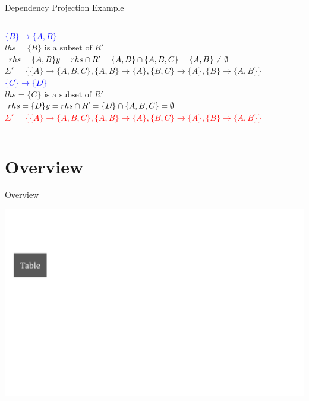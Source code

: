 \documentclass[UTF8]{beamer}
\begin{document}
\begin{frame}[fragile]{Dependency Projection Example}
\begin{columns}
\begin{column}{0.7\textwidth}
    \vspace{0.1cm}
    \pause
    \textcolor{blue}{$\{B\} \to \{A,B\}$}\\
    $lhs = \{B\} \text{ is a subset of } R'$\\
    $rhs = \{A,B\}\\
    y = rhs \cap R' = \{A,B\}\cap\{A,B,C\} = \{A,B\} \neq \emptyset$\\
    $\Sigma' = \{\{A\}\to \{A,B,C\}, \{A,B\} \to \{A\}, \{B,C\} \to \{A\}, \{B\} \to \{A,B\}\}$\\
    \vspace{0.1cm}
    \pause
    \textcolor{blue}{$\{C\} \to \{D\}$}\\
    $lhs = \{C\} \text{ is a subset of } R'$\\
    $rhs = \{D\}\\
    y = rhs \cap R' = \{D\}\cap\{A,B,C\} = \emptyset$\\
    \vspace{0.1cm}
    \pause
    \textcolor{red}{$\Sigma' = \{\{A\}\to \{A,B,C\}, \{A,B\} \to \{A\}, \{B,C\} \to \{A\}, \{B\} \to \{A,B\}\}$}
    \end{column}
\end{columns}
\end{frame}
\section{Overview}
\begin{frame}{Overview}
\begin{center}
    \includegraphics[width = 1\linewidth]{fd_norm_images/01.png}
\end{center}
\end{frame}
\end{document}
